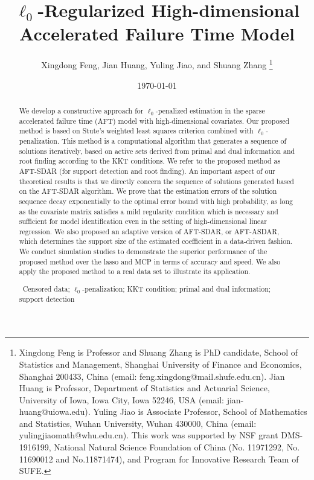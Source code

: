 \documentclass[12pt]{article}
\title{$\ell_0$-Regularized  High-dimensional Accelerated Failure Time 
Model}
\author{Xingdong Feng, Jian Huang, Yuling Jiao, and Shuang Zhang \footnote{Xingdong Feng is
Professor and Shuang Zhang is PhD candidate, School of Statistics and Management, Shanghai University of Finance and Economics, Shanghai  200433, China (email: feng.xingdong@mail.shufe.edu.cn). Jian Huang is Professor, Department of Statistics and Actuarial Science, University of Iowa, Iowa City, Iowa 52246, USA (email: jian-huang@uiowa.edu). Yuling Jiao is Associate Professor, School of Mathematics and Statistics, Wuhan University, Wuhan 430000, China (email: yulingjiaomath@whu.edu.cn).  This work  was supported by  NSF grant DMS-1916199,  National Natural Science Foundation of China (No. 11971292, No. 11690012 and No.11871474), and Program for Innovative Research Team of SUFE.}\\
}
\date{\today}
\renewcommand\baselinestretch{1.75}
\begin{document}
\maketitle

% 
\begin{abstract}
\renewcommand\baselinestretch{1.4}
{
We develop a constructive approach for $\ell_0$-penalized estimation in the sparse accelerated failure time (AFT)
model  with high-dimensional covariates.
Our proposed method is based on Stute's weighted least squares criterion combined with $\ell_0$-penalization.
This method is a computational algorithm that generates a sequence of solutions iteratively, based on  active sets derived from primal and dual information and root finding according to the KKT conditions.
We refer to the proposed method as AFT-SDAR (for support detection and root finding).
An important aspect of our theoretical results is that we directly concern the sequence of solutions generated based on the AFT-SDAR algorithm. We prove that the  estimation errors of the solution sequence decay exponentially to the optimal error bound
with high probability, as long as the covariate matrix satisfies a mild regularity condition which is necessary and sufficient for model identification  even in the setting of  high-dimensional linear regression.
We also proposed an adaptive version of AFT-SDAR, or AFT-ASDAR, which determines the support size of the estimated
coefficient in a data-driven fashion.
We conduct simulation studies to demonstrate the superior performance of the proposed method over the lasso and MCP in terms of accuracy and speed.
We also apply  the proposed method to a real data set to illustrate its application.

\bigskip

\ Censored data; $\ell_0$-penalization; KKT condition; primal and dual information; support detection}

\end{abstract}
\end{document}
